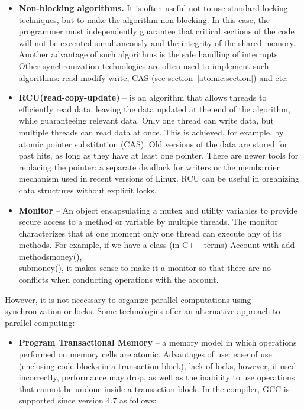 {\begin{itemize}
			\item\textbf{Non-blocking algorithms.} It is often useful not to use standard locking techniques, but to make the algorithm non-blocking. In this case, the programmer must independently guarantee that critical sections of the code will not be executed simultaneously and the integrity of the shared memory. Another advantage of such algorithms is the safe handling of interrupts. Other synchronization technologies are often used to implement such algorithms: read-modify-write, CAS (see section~\ref{atomic:section}) and etc.
			\item\textbf{RCU(read-copy-update)} – is an algorithm that allows threads to efficiently read data, leaving the data updated at the end of the algorithm, while guaranteeing relevant data. Only one thread can write data, but multiple threads can read data at once. This is achieved, for example, by atomic pointer substitution (CAS). Old versions of the data are stored for past hits, as long as they have at least one pointer. There are newer tools for replacing the pointer: a separate deadlock for writers or the membarrier mechanism used in recent versions of Linux. RCU can be useful in organizing data structures without explicit locks.
			\item\textbf{Monitor} – An object encapsulating a mutex and utility variables to provide secure access to a method or variable by multiple threads. The monitor characterizes that at one moment only one thread can execute any of its methods. For example, if we have a class (in C++ terms) Account with add methods\textunderscore money(),\\sub\textunderscore money(), it makes sense to make it a monitor so that there are no conflicts when conducting operations with the account.
		\end{itemize}
		\par However, it is not necessary to organize parallel computations using synchronization or locks. Some technologies offer an alternative approach to parallel computing:
		\begin{itemize}
			\item\textbf{Program Transactional Memory} – a memory model in which operations performed on memory cells are atomic. Advantages of use: ease of use (enclosing code blocks in a transaction block), lack of locks, however, if used incorrectly, performance may drop, as well as the inability to use operations that cannot be undone inside a transaction block. In the compiler, GCC is supported since version 4.7 as follows:

\end{itemize}}
